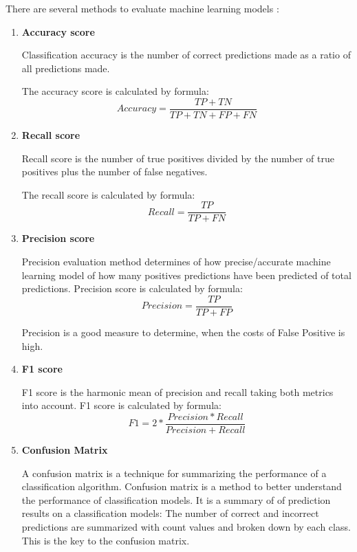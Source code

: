 There are several methods to evaluate machine learning models :
\begin{enumerate}
    
    \item \textbf{Accuracy score}
    
    Classification accuracy is the number of correct predictions made as a ratio of all predictions made.
    
    The accuracy score is calculated by formula:
    \begin{equation}
        Accuracy = \frac{TP + TN}{TP + TN + FP + FN}
    \end{equation}
    
    \item \textbf{Recall score}
    
    Recall score is the number of true positives divided by the number of true positives plus the number of false negatives.
    
    The recall score is calculated by formula:
    \begin{equation}
        Recall = \frac{TP}{TP + FN}
    \end{equation}
    
    \item \textbf{Precision score}
    
    Precision evaluation method determines of how precise/accurate machine learning model of how many positives predictions have been predicted of total predictions. Precision score is calculated by formula:
    \begin{equation}
        Precision = \frac{TP}{\mathit{TP} + \mathit{FP}}
    \end{equation}
    
    Precision is a good measure to determine, when the costs of False Positive is high. 
    
    
    \item \textbf{F1 score}
    
    F1 score is the harmonic mean of precision and recall taking both metrics into account. F1 score is calculated by formula:
    \begin{equation}
        F1 = 2 * \frac{Precision * Recall}{Precision + Recall}
    \end{equation}    
    \item \textbf{Confusion Matrix}
    
    A confusion matrix is a technique for summarizing the performance of a classification algorithm. Confusion matrix is a method to better understand the performance of classification models. It is a summary of of prediction results on a classification models: The number of correct and incorrect predictions are summarized with count values and broken down by each class. This is the key to the confusion matrix.
    
    

\end{enumerate}
